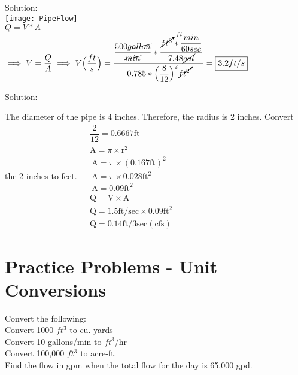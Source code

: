 Solution:\\
\vspace{0.5cm}
\texttt{[image: PipeFlow]}\\
$Q=V*A$\\
$\implies V=\dfrac{Q}{A} \implies V \Big(\dfrac{ft}{s}\Big)= \dfrac{\dfrac{500\cancel{gallon}}{\cancel{min}}*\dfrac{\cancelto{ft}{ft^3}*\dfrac{min}{60sec}}{7.48\cancel{gal}}}{0.785*\Big(\dfrac{8}{12}\Big)^2\cancelto{}{ft^2}}=\boxed{3.2ft/s}$

Solution:\\

\vspace{0.5cm}

The diameter of the pipe is 4 inches. Therefore, the radius is 2 inches. Convert the 2 inches to feet.
$
\begin{aligned}
&\dfrac{2}{12}=0.6667 \mathrm{ft} \\
&\mathrm{A}=\pi \times \mathrm{r}^{2} \\
&\mathrm{~A}=\pi \times(0.167 \mathrm{ft})^{2} \\
&\mathrm{~A}=\pi \times 0.028 \mathrm{ft}^{2} \\
&\mathrm{~A}=0.09 \mathrm{ft}^{2} \\
&\mathrm{Q}=\mathrm{V} \times \mathrm{A} \\
&\mathrm{Q}=1.5 \mathrm{ft} / \mathrm{sec} \times 0.09 \mathrm{ft}^{2} \\
&\mathrm{Q}=0.14 \mathrm{ft} / 3 \mathrm{sec}(\mathrm{cfs})
\end{aligned}
$



\vspace{1cm}

\vspace{1cm}

\section*{Practice Problems - Unit Conversions}
Convert the following:\\

Convert 1000 $ft^3$ to cu. yards\\

Convert 10 gallons/min to $ft^3$/hr\\

Convert 100,000 $ft^3$ to acre-ft.\\

Find the flow in gpm when the total flow for the day is 65,000 gpd.


